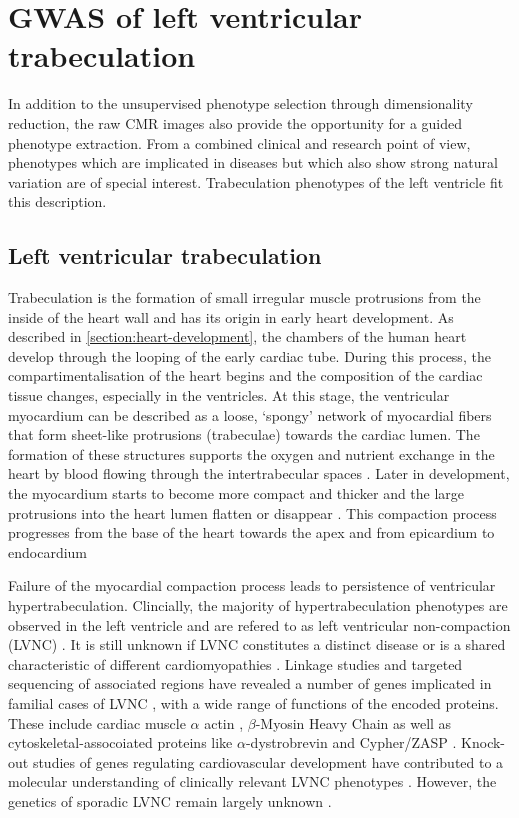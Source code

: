 \chapter{GWAS of left ventricular trabeculation}
\label{chapter:FD}
In addition to the unsupervised phenotype selection through dimensionality reduction, the raw CMR images also provide the opportunity for a guided phenotype extraction. From a combined clinical and research point of view, phenotypes which are implicated in diseases but which also show strong natural variation are of special interest. Trabeculation phenotypes of the left ventricle fit this description.

\section{Left ventricular trabeculation}
\label{section:intro-FD}
Trabeculation is the formation of small irregular muscle protrusions from the inside of the heart wall and has its origin in early heart development. As described in \cref{section:heart-development}, the chambers of the human heart develop through the looping of the early cardiac tube. During this process, the compartimentalisation of the heart begins and the composition of the cardiac tissue changes, especially in the ventricles. At this stage, the ventricular myocardium can be described as a loose, `spongy' network of myocardial fibers that form sheet-like protrusions (trabeculae) towards the cardiac lumen. The formation of these structures supports the oxygen and nutrient exchange in the heart \citep{Chen2009} by blood flowing through the intertrabecular spaces \citep{Zambrano2002}. Later in development, the myocardium starts to become more compact and thicker and the large protrusions into the heart lumen flatten or disappear \citep{Yousef2009}. This compaction process progresses from the base of the heart towards the apex and from epicardium to endocardium \citep{Zabrano2002}


Failure of the myocardial compaction process leads to persistence of ventricular hypertrabeculation. Clincially, the majority of hypertrabeculation phenotypes are observed in the left ventricle and are refered to as left ventricular non-compaction (LVNC) \citep{Zambrano2002}. It is still unknown if LVNC constitutes a distinct disease or is a shared characteristic of different cardiomyopathies \citep{Captur2013}. Linkage studies and targeted sequencing of associated regions have revealed a number of genes implicated in familial cases of LVNC \citep{Bleyl1997,Klaasen2008,Moric-Janiszewska2008}, with a wide range of functions of the encoded proteins. These include cardiac muscle \(\alpha\) actin \citep{Montserrat2007}, 
\(\beta\)-Myosin Heavy Chain \citep{Budde2007} as well as cytoskeletal-assocoiated proteins like \(\alpha\)-dystrobrevin \citep{Ichida2001} and Cypher/ZASP \citep{Vatt2003}. Knock-out studies of genes regulating cardiovascular development have contributed to a molecular understanding of clinically relevant LVNC phenotypes \citep{Chen2009,Mysliwiec2011}. However, the genetics of sporadic LVNC remain largely unknown \citep{Zambrano2002}.


